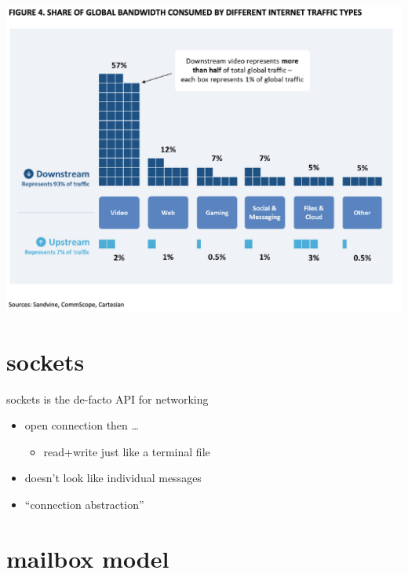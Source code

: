 \begin{frame}{}
\begin{center}
\includegraphics[width=0.8\pagewidth]{../network/internet_data.png}
\end{center}
\end{frame}


\section{sockets}

\begin{frame}{sockets is the de-facto API for networking}
    \begin{itemize}
    \item open connection then \ldots
        \begin{itemize}
        \item read+write just like a terminal file
        \end{itemize}
    \vspace{.5cm}
    \item doesn't look like individual messages
    \item ``connection abstraction''
    \end{itemize}
\end{frame}

\section{mailbox model}


